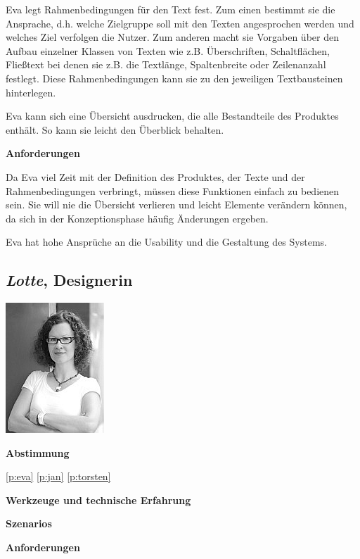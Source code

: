 \begin{multicols}{2}
Eva legt Rahmenbedingungen für den Text fest. Zum einen bestimmt sie die Ansprache, d.h. welche Zielgruppe soll mit den Texten angesprochen werden und welches Ziel verfolgen die Nutzer. Zum anderen macht sie Vorgaben über den Aufbau einzelner Klassen von Texten wie z.B. Überschriften, Schaltflächen, Fließtext bei denen sie z.B. die Textlänge, Spaltenbreite oder Zeilenanzahl festlegt. Diese Rahmenbedingungen kann sie zu den jeweiligen Textbausteinen hinterlegen.

Eva kann sich eine Übersicht ausdrucken, die alle Bestandteile des Produktes enthält. So kann sie leicht den Überblick behalten.

\textbf{Anforderungen}

Da Eva viel Zeit mit der Definition des Produktes, der Texte und der Rahmenbedingungen verbringt, müssen diese Funktionen einfach zu bedienen sein. Sie will nie die Übersicht verlieren und leicht Elemente verändern können, da sich in der Konzeptionsphase häufig Änderungen ergeben. 

Eva hat hohe Ansprüche an die Usability und die Gestaltung des Systems.

\end{multicols}

\pagebreak

\subsection{\emph{Lotte}, Designerin}\label{p:lotte}

\begin{multicols}{2}

\begin{center}
\includegraphics[width=0.5\columnwidth]{media/lotte.jpg}
\end{center}


\textbf{Abstimmung}

\ref{p:eva}
\ref{p:jan}
\ref{p:torsten}

\textbf{Werkzeuge und technische Erfahrung}

\columnbreak

\textbf{Szenarios}

\textbf{Anforderungen}

\end{multicols}

